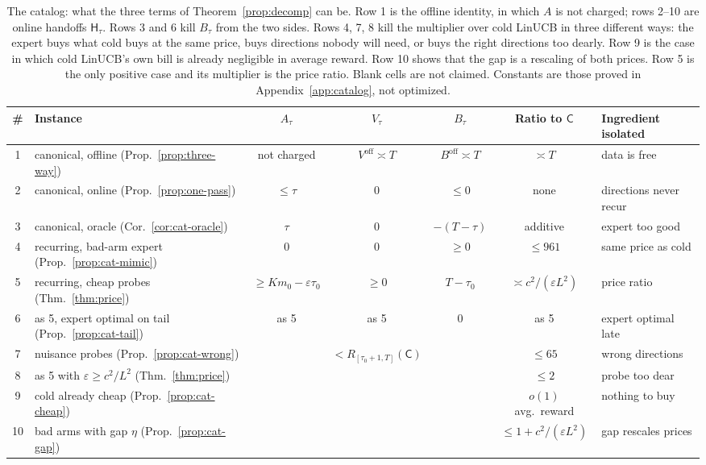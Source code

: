 \documentclass{article}
\theoremstyle{definition}
\theoremstyle{remark}
\newcommand{\eps}{\varepsilon}
\theoremstyle{remark}
\newcommand{\Cold}{\mathsf{C}}
\newcommand{\Hyb}{\mathsf{H}}
\begin{document}
\begin{table}[t]
\centering
\scriptsize
\setlength{\tabcolsep}{2.5pt}
\begin{tabular}{@{}clccccl@{}}
\toprule
\# & Instance & $A_\tau$ & $V_\tau$ & $B_\tau$ & Ratio to $\Cold$ & Ingredient isolated\\
\midrule
1 & canonical, offline (Prop.~\ref{prop:three-way}) & not charged & $V^{\mathrm{off}}\asymp T$ & $B^{\mathrm{off}}\asymp T$ & $\asymp T$ & data is free\\
2 & canonical, online (Prop.~\ref{prop:one-pass}) & $\le\tau$ & $0$ & $\le0$ & none & directions never recur\\
3 & canonical, oracle (Cor.~\ref{cor:cat-oracle}) & $\tau$ & $0$ & $-(T-\tau)$ & additive & expert too good\\
4 & recurring, bad-arm expert (Prop.~\ref{prop:cat-mimic}) & $0$ & $0$ & $\ge0$ & $\le961$ & same price as cold\\
5 & recurring, cheap probes (Thm.~\ref{thm:price}) & $\ge Km_0-\eps\tau_0$ & $\ge0$ & $T-\tau_0$ & $\asymp c^2/(\eps L^2)$ & price ratio\\
6 & as 5, expert optimal on tail (Prop.~\ref{prop:cat-tail}) & as 5 & as 5 & $0$ & as 5 & expert optimal late\\
7 & nuisance probes (Prop.~\ref{prop:cat-wrong}) & & $<R_{[\tau_0+1,T]}(\Cold)$ & & $\le65$ & wrong directions\\
8 & as 5 with $\eps\ge c^2/L^2$ (Thm.~\ref{thm:price}) & & & & $\le2$ & probe too dear\\
9 & cold already cheap (Prop.~\ref{prop:cat-cheap}) & & & & $o(1)$ avg.\ reward & nothing to buy\\
10 & bad arms with gap $\eta$ (Prop.~\ref{prop:cat-gap}) & & & & $\le1+c^2/(\eps L^2)$ & gap rescales prices\\
\bottomrule
\end{tabular}
\caption{The catalog: what the three terms of Theorem~\ref{prop:decomp} can be.
Row 1 is the offline identity, in which $A$ is not charged; rows 2--10 are
online handoffs $\Hyb_\tau$. Rows 3 and 6 kill $B_\tau$ from the two sides.
Rows 4, 7, 8 kill the multiplier over cold LinUCB in three different ways:
the expert buys what cold buys at the same price, buys directions nobody will
need, or buys the right directions too dearly. Row 9 is the case in which cold
LinUCB's own bill is already negligible in average reward. Row 10 shows that
the gap is a rescaling of both prices. Row 5 is the only positive case and
its multiplier is the price ratio. Blank cells are not claimed. Constants are
those proved in Appendix~\ref{app:catalog}, not optimized.}
\label{tab:catalog}
\end{table}
\end{document}
